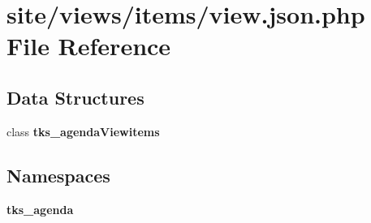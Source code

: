 \section{site/views/items/view.json.\+php File Reference}
\label{view_8json_8php}
\subsection*{Data Structures}
\begin{DoxyCompactItemize}
\item 
class \textbf{ tks\+\_\+agenda\+Viewitems}
\end{DoxyCompactItemize}
\subsection*{Namespaces}
\begin{DoxyCompactItemize}
\item 
 \textbf{ tks\+\_\+agenda}
\end{DoxyCompactItemize}

